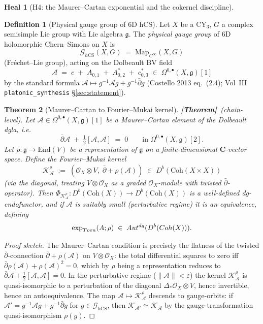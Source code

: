 \documentclass[11pt]{amsart}
\newtheorem{theorem}{Theorem}
\theoremstyle{definition}
\newtheorem{heal}[attack]{Heal}
\newtheorem{definition}[theorem]{Definition}
\providecommand{\Coh}{\mathrm{Coh}}
\providecommand{\Autdg}{\mathrm{Aut}^{\rm dg}}
\providecommand{\End}{\mathrm{End}}
\providecommand{\hCS}{h\mathrm{CS}}
\providecommand{\fg}{\mathfrak{g}}
\providecommand{\cO}{\mathcal{O}}
\providecommand{\cA}{\mathcal{A}}
\providecommand{\cK}{\mathcal{K}}
\providecommand{\cG}{\mathcal{G}}
\providecommand{\bC}{\mathbf{C}}
\providecommand{\ClaimStatusTheorem}{\textbf{[Theorem]}}
\begin{document}
\begin{heal}[H4: the Maurer--Cartan exponential and the cokernel
discipline]
\leavevmode

\begin{definition}[Physical gauge group of 6D hCS]
\label{def:hCS-gauge}
Let $X$ be a CY$_3$, $G$ a complex semisimple Lie group with Lie
algebra $\fg$. The \emph{physical gauge group} of 6D holomorphic
Chern--Simons on $X$ is
\[
 \cG_{\hCS}(X, G) \;=\; \mathrm{Map}_{C^\infty}(X, G)
\]
(Fr\'echet--Lie group), acting on the Dolbeault BV field
\[
 \cA \;=\; c \;+\; A_{0,1} \;+\; A^*_{0,2} \;+\; c^*_{0,3}
 \;\in\; \Omega^{0,\bullet}(X, \fg)[1]
\]
by the standard formula
$\cA \mapsto g^{-1} \cA g + g^{-1} \bar\partial g$
(Costello 2013 eq.~(2.4); Vol~III \texttt{platonic\_synthesis}
\S\ref{sec:statement}).
\end{definition}

\begin{theorem}[Maurer--Cartan to Fourier--Mukai kernel]
\label{thm:MC-FM}
\ClaimStatusTheorem\ (chain-level). Let $\cA \in
\Omega^{0,\bullet}(X, \fg)[1]$ be a Maurer--Cartan element of the
Dolbeault dgla, i.e.
\[
 \bar\partial \cA \;+\; \tfrac{1}{2}[\cA, \cA] \;=\; 0
 \qquad\text{in } \Omega^{0,\bullet}(X, \fg)[2].
\]
Let $\rho \colon \fg \to \End(V)$ be a representation of $\fg$ on a
finite-dimensional $\bC$-vector space. Define the Fourier--Mukai
kernel
\[
 \cK_\cA^\rho \;:=\; (\cO_X \otimes V, \;\bar\partial + \rho(\cA))
 \;\in\; D^b(\Coh(X \times X))
\]
(via the diagonal, treating $V \otimes \cO_X$ as a graded
$\cO_X$-module with twisted $\bar\partial$-operator). Then
$\Phi_{\cK_\cA^\rho} \colon D^b(\Coh(X)) \to D^b(\Coh(X))$ is a
well-defined dg-endofunctor, and if $\cA$ is suitably small (perturbative
regime) it is an equivalence, defining
\[
 \exp_{\rm Toen}(\cA; \rho) \;\in\; \Autdg(D^b(\Coh(X))).
\]
\end{theorem}

\begin{proof}[Proof sketch]
The Maurer--Cartan condition is precisely the flatness of the
twisted $\bar\partial$-connection
$\bar\partial + \rho(\cA)$ on $V \otimes \cO_X$: the total
differential squares to zero iff $\bar\partial \rho(\cA) +
\rho(\cA)^2 = 0$, which by $\rho$ being a representation reduces to
$\bar\partial \cA + \tfrac{1}{2}[\cA, \cA] = 0$. In the perturbative
regime ($\|\cA\| < \varepsilon$) the kernel
$\cK_\cA^\rho$ is quasi-isomorphic to a perturbation of the diagonal
$\Delta_* \cO_X \otimes V$, hence invertible, hence an
autoequivalence. The map $\cA \mapsto \cK_\cA^\rho$ descends to
gauge-orbits: if $\cA' = g^{-1} \cA g + g^{-1} \bar\partial g$ for
$g \in \cG_{\hCS}$, then $\cK_{\cA'} \simeq \cK_{\cA}$ by the
gauge-transformation quasi-isomorphism $\rho(g)$.
\end{proof}


\end{heal}
\end{document}
